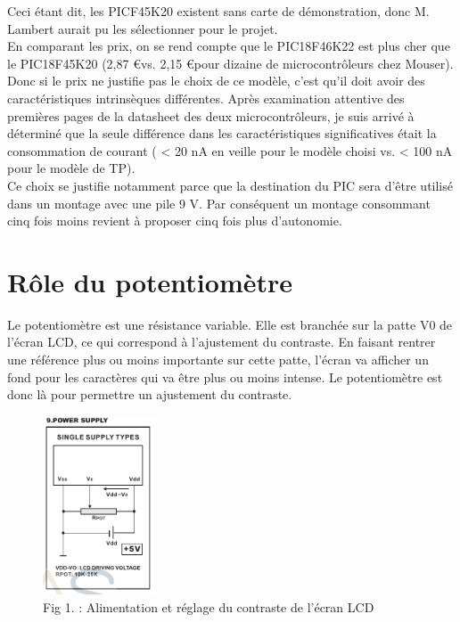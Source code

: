 \documentclass[a4paper,11pt,titlepage]{article}
\begin{document}
Ceci étant dit, les PICF45K20 existent sans carte de démonstration, donc M. Lambert aurait pu les sélectionner pour le projet.\\

En comparant les prix, on se rend compte que le PIC18F46K22 est plus cher que le PIC18F45K20 (2,87 \euro  vs. 2,15 \euro  pour dizaine de microcontrôleurs chez Mouser). Donc si le prix ne justifie pas le choix de ce modèle, c'est qu'il doit avoir des caractéristiques intrinsèques différentes. Après examination attentive des premières pages de la datasheet des deux microcontrôleurs, je suis arrivé à déterminé que la seule différence dans les caractéristiques significatives était la consommation de courant ( < 20 nA en veille pour le modèle choisi vs. < 100 nA pour le modèle de TP).\\

Ce choix se justifie notamment parce que la destination du PIC sera d'être utilisé dans un montage avec une pile 9 V. Par conséquent un montage consommant cinq fois moins revient à proposer cinq fois plus d'autonomie. 

\section{Rôle du potentiomètre}

Le potentiomètre est une résistance variable. Elle est branchée sur la patte V0 de l'écran LCD, ce qui correspond à l'ajustement du contraste. En faisant rentrer une référence plus ou moins importante sur cette patte, l'écran va afficher un fond pour les caractères qui va être plus ou moins intense. Le potentiomètre est donc là pour permettre un ajustement du contraste.\\

\begin{figure}[h]
  \begin{center}
    \includegraphics[width=0.3\textwidth]{img/LCD_Supply.png}
    \caption{Fig 1. : Alimentation et réglage du contraste de l'écran LCD}
    \label{fig:}
  \end{center}
\end{figure}
\end{document}
